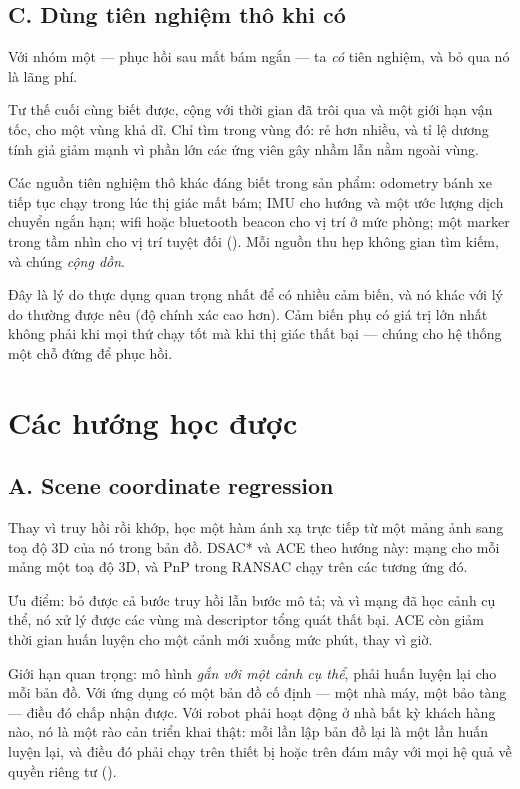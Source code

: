 \documentclass[../../vslam.tex]{subfiles}
\begin{document}
\subsection{C. Dùng tiên nghiệm thô khi có}

Với nhóm một --- phục hồi sau mất bám ngắn --- ta \emph{có} tiên nghiệm, và bỏ qua nó là lãng phí.

Tư thế cuối cùng biết được, cộng với thời gian đã trôi qua và một giới hạn vận tốc, cho một vùng khả dĩ. Chỉ tìm trong vùng đó: rẻ hơn nhiều, và tỉ lệ dương tính giả giảm mạnh vì phần lớn các ứng viên gây nhầm lẫn nằm ngoài vùng.

Các nguồn tiên nghiệm thô khác đáng biết trong sản phẩm: odometry bánh xe tiếp tục chạy trong lúc thị giác mất bám; IMU cho hướng và một ước lượng dịch chuyển ngắn hạn; wifi hoặc bluetooth beacon cho vị trí ở mức phòng; một marker trong tầm nhìn cho vị trí tuyệt đối (). Mỗi nguồn thu hẹp không gian tìm kiếm, và chúng \emph{cộng dồn}.

Đây là lý do thực dụng quan trọng nhất để có nhiều cảm biến, và nó khác với lý do thường được nêu (độ chính xác cao hơn). Cảm biến phụ có giá trị lớn nhất không phải khi mọi thứ chạy tốt mà khi thị giác thất bại --- chúng cho hệ thống một chỗ đứng để phục hồi.

\section{Các hướng học được}

\subsection{A. Scene coordinate regression}

Thay vì truy hồi rồi khớp, học một hàm ánh xạ trực tiếp từ một mảng ảnh sang toạ độ \(3\)D của nó trong bản đồ. DSAC* \cite{brachmann2022dsacstar} và ACE \cite{brachmann2023ace} theo hướng này: mạng cho mỗi mảng một toạ độ \(3\)D, và PnP trong RANSAC chạy trên các tương ứng đó.

Ưu điểm: bỏ được cả bước truy hồi lẫn bước mô tả; và vì mạng đã học cảnh cụ thể, nó xử lý được các vùng mà descriptor tổng quát thất bại. ACE còn giảm thời gian huấn luyện cho một cảnh mới xuống mức phút, thay vì giờ.

Giới hạn quan trọng: mô hình \emph{gắn với một cảnh cụ thể}, phải huấn luyện lại cho mỗi bản đồ. Với ứng dụng có một bản đồ cố định --- một nhà máy, một bảo tàng --- điều đó chấp nhận được. Với robot phải hoạt động ở nhà bất kỳ khách hàng nào, nó là một rào cản triển khai thật: mỗi lần lập bản đồ lại là một lần huấn luyện lại, và điều đó phải chạy trên thiết bị hoặc trên đám mây với mọi hệ quả về quyền riêng tư ().
\end{document}
